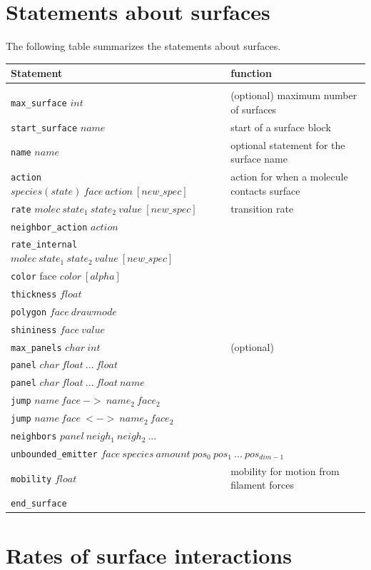 \documentclass {scrbook}
\newcommand {\ttt} {\texttt}
\begin{document}
\section{Statements about surfaces}

The following table summarizes the statements about surfaces.

\begin{longtable}[c]{ll}
Statement & function\\
\hline\\
\ttt{max\_surface} $int$ & (optional) maximum number of surfaces\\
\ttt{start\_surface} $name$ & start of a surface block\\
\ttt{name} $name$ & optional statement for the surface name\\
\ttt{action} $species(state)\ face\ action\ [new\_spec]$ & action for when a molecule contacts surface\\
\ttt{rate} $molec\ state_1\ state_2\ value\ [new\_spec]$ & transition rate\\
\ttt{neighbor\_action} $action$\\
\ttt{rate\_internal} $molec\ state_1\ state_2\ value\ [new\_spec]$\\
\ttt{color} face $color\ [alpha]$\\
\ttt{thickness} $float$\\
\ttt{polygon} $face\ drawmode$\\
\ttt{shininess} $face\ value$\\
\ttt{max\_panels} $char\ int$ & (optional)\\
\ttt{panel} $char\ float\ ...\ float$\\
\ttt{panel} $char\ float\ ...\ float\ name$\\
\ttt{jump} $name\ face\ ->\ name_2\ face_2$\\
\ttt{jump} $name\ face\ <->\ name_2\ face_2$\\
\ttt{neighbors} $panel\ neigh_1\ neigh_2\ ...$\\
\multicolumn{2}{l}{
\ttt{unbounded\_emitter} $face\ species\ amount\ pos_0\ pos_1\ ...\ pos_{dim-1}$}\\
\ttt{mobility} $float$ & mobility for motion from filament forces\\
\ttt{end\_surface}
\end{longtable}

\section{Rates of surface interactions}
\end{document}
